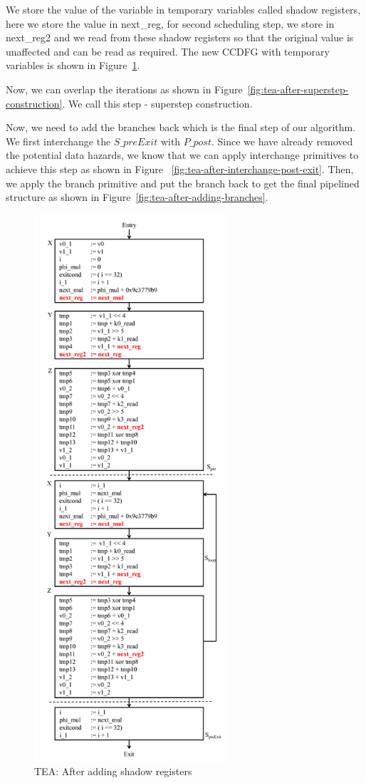 We store the value of the variable in temporary variables called shadow registers, here we store the value in next\_reg, for second scheduling
step, we store in next\_reg2 and we read from these shadow registers so that the original value is unaffected and can be read as required. The new CCDFG with 
temporary variables is shown in Figure~\ref{fig:tea-after-shadow-register}.

Now, we can overlap the iterations as shown in Figure~\ref{fig:tea-after-superstep-construction}. We call this step - superstep construction. 

Now, we need to add the branches back which is the final step of our algorithm. We first interchange the $S\_{preExit}$ with $P\_{post}$. Since we have already removed the potential data hazards, we know that we can apply interchange primitives to achieve this step as shown in Figure ~\ref{fig:tea-after-interchange-post-exit}. Then, we apply the branch primitive and put the branch back to get the final pipelined structure as shown in Figure~\ref{fig:tea-after-adding-branches}.
 

\begin{figure}[H]
\begin{center}
\includegraphics[height=8in]{fig-proposal/tea-after-shadow-reg}
\caption{TEA: After adding shadow registers}
\label{fig:tea-after-shadow-register}
\end{center}
\end{figure}




